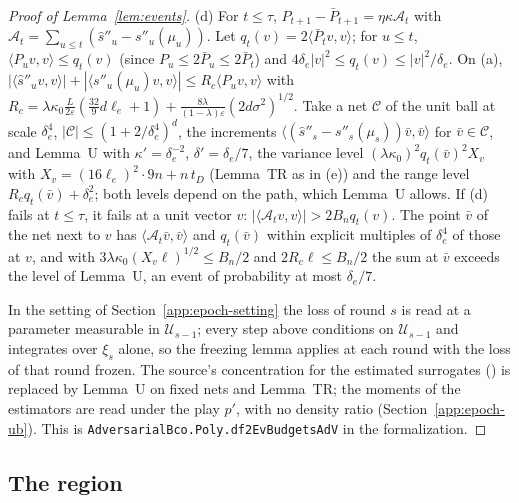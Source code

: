 \documentclass[11pt]{amsart}
\theoremstyle{definition}
\numberwithin{equation}{section}
\newcommand{\ip}[1]{\langle #1\rangle}
\begin{document}
\begin{proof}[Proof of Lemma~\ref{lem:events}]
(d) For $t\le\tau$, $P_{t+1}-\bar P_{t+1}=\eta\kappa\mathcal A_t$ with $\mathcal A_t=\sum_{u\le t}(\hat s''_u-s''_u(\mu_u))$. Let $q_t(v)=2\ip{\bar P_tv,v}$; for $u\le t$, $\ip{P_uv,v}\le q_t(v)$ (since $P_u\le2\bar P_u\le2\bar P_t$) and $4\delta_e|v|^2\le q_t(v)\le|v|^2/\delta_e$. On (a), $|\ip{\hat s''_uv,v}|+|\ip{s''_u(\mu_u)v,v}|\le R_c\ip{P_uv,v}$ with $R_c=\lambda\kappa_0\frac L{2\varepsilon}(\frac{32}9d\ell_e+1)+\frac{8\lambda}{(1-\lambda)\varepsilon}(2d\sigma^2)^{1/2}$. Take a net $\mathcal C$ of the unit ball at scale $\delta_e^4$, $|\mathcal C|\le(1+2/\delta_e^4)^d$, the increments $\ip{(\hat s''_s-s''_s(\mu_s))\bar v,\bar v}$ for $\bar v\in\mathcal C$, and Lemma~U with $\kappa'=\delta_e^{-2}$, $\delta'=\delta_e/7$, the variance level $(\lambda\kappa_0)^2q_t(\bar v)^2X_v$ with $X_v=(16\ell_e)^2\cdot9n+n\,t_D$ (Lemma~TR as in (e)) and the range level $R_cq_t(\bar v)+\delta_e^2$; both levels depend on the path, which Lemma~U allows. If (d) fails at $t\le\tau$, it fails at a unit vector $v$: $|\ip{\mathcal A_tv,v}|>2B_nq_t(v)$. The point $\bar v$ of the net next to $v$ has $\ip{\mathcal A_t\bar v,\bar v}$ and $q_t(\bar v)$ within explicit multiples of $\delta_e^4$ of those at $v$, and with $3\lambda\kappa_0(X_v\ell)^{1/2}\le B_n/2$ and $2R_c\ell\le B_n/2$ the sum at $\bar v$ exceeds the level of Lemma~U, an event of probability at most $\delta_e/7$.

In the setting of Section~\ref{app:epoch-setting} the loss of round $s$ is read at a parameter measurable in $\mathcal U_{s-1}$; every step above conditions on $\mathcal U_{s-1}$ and integrates over $\xi_s$ alone, so the freezing lemma applies at each round with the loss of that round frozen. The source's concentration for the estimated surrogates (\cite[Propositions~12.22, 12.23, 12.24, 12.27 and~12.30]{Lat24}) is replaced by Lemma~U on fixed nets and Lemma~TR; the moments of the estimators are read under the play $p'$, with no density ratio (Section~\ref{app:epoch-ub}).
This is \texttt{AdversarialBco.Poly.df2EvBudgetsAdV} in the formalization.
\end{proof}

\subsection{The region}\label{app:epoch-region}
\end{document}
